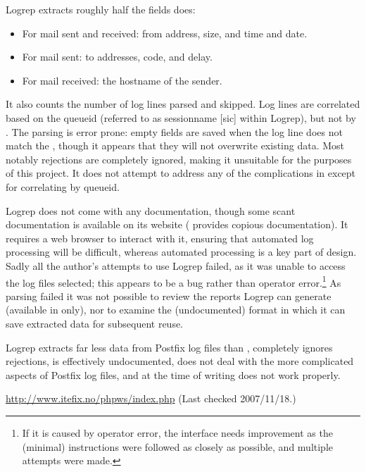 Logrep extracts roughly half the fields \parsername{} does:

\begin{itemize}

    \item For mail sent and received: from address, size, and time and
        date.

    \item For mail sent: to addresses, \SMTP{} code, and delay.

    \item For mail received: the hostname of the sender.

\end{itemize}

It also counts the number of log lines parsed and skipped.  Log lines are
correlated based on the queueid (referred to as sessionname [sic] within
Logrep), but not by \pid{}.  The parsing is error prone: empty fields are
saved when the log line does not match the \regex{}, though it appears that
they will not overwrite existing data.  Most notably rejections are
completely ignored, making it unsuitable for the purposes of this project.
It does not attempt to address any of the complications in
  except for
correlating by queueid.

Logrep does not come with any documentation, though some scant
documentation is available on its website (\parsername{} provides copious
documentation).  It requires a web browser to interact with it, ensuring
that automated log processing will be difficult, whereas automated
processing is a key part of \parsernames{} design.  Sadly all the author's
attempts to use Logrep failed, as it was unable to access the log files
selected; this appears to be a bug rather than operator error.\footnote{If
it is caused by operator error, the interface needs improvement as the
(minimal) instructions were followed as closely as possible, and multiple
attempts were made.}  As parsing failed it was not possible to review the
reports Logrep can generate (available in \HTML{} only), nor to examine the
(undocumented) format in which it can save extracted data for subsequent
reuse.

Logrep extracts far less data from Postfix log files than \parsername{},
completely ignores rejections, is effectively undocumented, does not deal
with the more complicated aspects of Postfix log files, and at the time of
writing does not work properly.

\url{http://www.itefix.no/phpws/index.php} \newline (Last checked
2007/11/18.)

